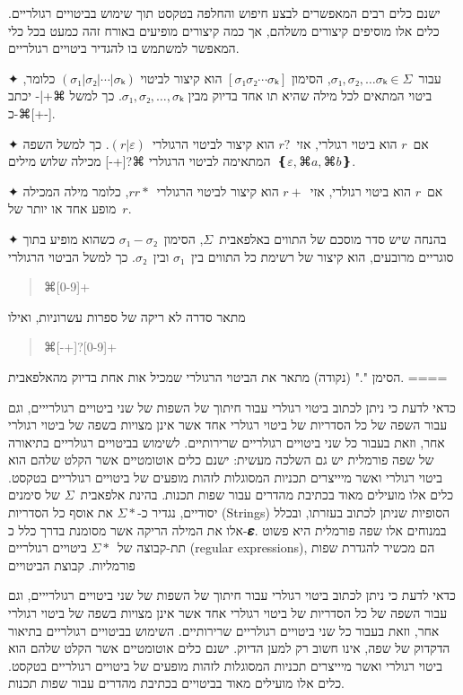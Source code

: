 ישנם כלים רבים המאפשרים לבצע חיפוש והחלפה בטקסט תוך שימוש בביטויים רגולריים.
כלים אלו מוסיפים קיצורים משלהם, אך כמה קיצורים מופיעים באורח זהה כמעט בכל כלי
המאפשר למשתמש בו להגדיר ביטויים רגולריים.

✦ עבור~$σ₁,σ₂,…σₖ∈Σ$, הסימון
$[σ₁σ₂⋯σₖ]$
הוא קיצור לביטוי
$(σ₁|σ₂|⋯|σₖ)$
כלומר, ביטוי המתאים לכל מילה שהיא תו אחד בדיוק מבין
$σ₁,σ₂,…,σₖ$.
כך למשל ⌘{+|-}
יכתב כ-⌘{[+-]}.

✦ אם~$r$ הוא ביטוי רגולרי, אזי~$r?$ הוא קיצור לביטוי הרגולרי~$(r|ε)$. כך למשל
השפה המתאימה לביטוי הרגולרי ⌘{?[+-]} מכילה שלוש מילים~$❴ε, ⌘a, ⌘b❵$.

✦ אם~$r$ הוא ביטוי רגולרי, אזי~$r+$ הוא קיצור לביטוי הרגולרי~$rr*$, כלומר מילה
המכילה מופע אחד או יותר של~$r$.

✦ בהנחה שיש סדר מוסכם של התווים באלפאבית~$Σ$, הסימון~$σ₁-σ₂$ כשהוא מופיע בתוך
סוגריים מרובעים, הוא קיצור של רשימת כל התווים בין~$σ₁$ ובין~$σ₂$.
כך למשל הביטוי הרגולרי
\begin{quote}
  ⌘{[0-9]+}
\end{quote}
מתאר סדרה לא ריקה של ספרות עשרוניות, ואילו
\begin{quote}
  ⌘{[-+]?[0-9]+}
\end{quote}
הסימן "." (נקודה) מתאר את הביטוי הרגולרי שמכיל אות אחת בדיוק מהאלפאבית.
====

כדאי לדעת כי ניתן לכתוב ביטוי רגולרי עבור חיתוך של השפות של שני ביטויים
רגולרייים, וגם עבור השפה של כל הסדריות של ביטוי רגולרי אחד אשר אינן מצויות בשפה
של ביטוי רגולרי אחר, וזאת בעבור כל שני ביטויים רגולריים שרירותיים. לשימוש
בביטויים רגולריים בתיאורה של שפה פורמלית יש גם השלכה מעשית: ישנם כלים אוטומטיים
אשר הקלט שלהם הוא ביטוי רגולרי ואשר מיייצרים תכניות המסוגלות לזהות
מופעים של ביטויים רגולריים בטקסט. כלים אלו מועילים מאוד בכתיבת מהדרים עבור שפות
תכנות. בהינת אלפאבית~$Σ$ של סימנים יסודיים, נגדיר כ-$Σ*$ את אוסף כל
הסדריות (Strings) הסופיות שניתן לכתוב בעזרתו, ובכלל אלו את המילה הריקה אשר
מסומנת בדרך כלל כ-𝜺. במנוחים אלו שפה פורמלית היא פשוט תת-קבוצה של~$Σ*$ ביטויים
רגולריים (regular expressions), הם מכשיר להגדרת שפות פורמליות. קבוצת הביטויים

כדאי לדעת כי ניתן לכתוב ביטוי רגולרי עבור חיתוך של השפות של שני ביטויים
רגולרייים, וגם עבור השפה של כל הסדריות של ביטוי רגולרי אחד אשר אינן מצויות בשפה
של ביטוי רגולרי אחר, וזאת בעבור כל שני ביטויים רגולריים שרירותיים. השימוש
בביטויים רגולריים בתיאור הדקדוק של שפה, אינו חשוב רק למען הדיוק. ישנם כלים
אוטומטיים אשר הקלט שלהם הוא ביטוי רגולרי ואשר מיייצרים תכניות המסוגלות לזהות
מופעים של ביטויים רגולריים בטקסט. כלים אלו מועילים מאוד בביטויים בכתיבת מהדרים
עבור שפות תכנות.

